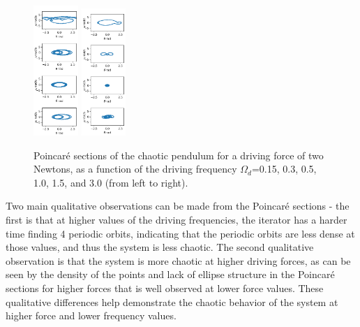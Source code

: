 \documentclass[11pt]{article} %
\begin{document}
\begin{figure}[H]
        \includegraphics[width=0.15\textwidth]{pcr_2.0_1.5.png}
        \includegraphics[width=0.15\textwidth]{pcr_2.0_3.0.png}
        \caption{Poincar\'e sections of the chaotic pendulum for a driving force of two Newtons, as a function of the driving frequency $\Omega_d$=0.15, 0.3, 0.5, 1.0, 1.5, and 3.0 (from left to right).}
        \label{fig:poincare}
    \end{figure}
    Two main qualitative observations can be made from the Poincar\'e sections - the first is that at higher values of the driving frequencies,
    the iterator has a harder time finding 4 periodic orbits, indicating that the periodic orbits are less dense at those values, and thus
    the system is less chaotic. The second qualitative observation is that the system is more chaotic at higher driving forces, as can be seen by the
    density of the points and lack of ellipse structure in the Poincar\'e sections for higher forces that is well observed at lower force values. These
    qualitative differences help demonstrate the chaotic behavior of the system at higher force and lower frequency values.\\
\end{document}
